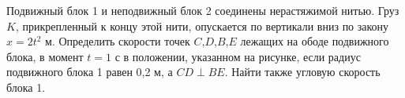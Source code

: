 Подвижный блок 1 и неподвижный блок 2 соединены нерастяжимой нитью. Груз $K$, прикрепленный к концу этой нити,
опускается по вертикали вниз по закону $x=2t^2$ м. Определить скорости точек $C$,$D$,$B$,$E$ лежащих на ободе
подвижного блока, в момент $t=1$ с в положении, указанном на рисунке, если радиус подвижного блока 1 равен
0,2 м, а $CD \perp BE$. Найти также угловую скорость блока 1.
